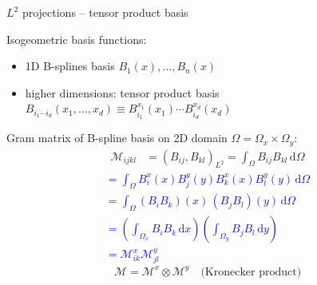 \documentclass[c]{beamer}
\newcommand{\inblue}[1]{\textcolor{blue}{#1}}
\newcommand{\Prod}[2]{(#1, #2)_{L^2}}
\begin{document}
\begin{frame}{$L^2$ projections -- tensor product basis}

Isogeometric basis functions:
\begin{itemize}
  \item 1D B-splines basis $B_1(x),\ldots, B_n(x)$
  \item higher dimensions: tensor product basis\\
        $B_{i_1\cdots i_d}(x_1,\ldots,x_d)
        \equiv B^{x_1}_{i_1}(x_1)\cdots B^{x_d}_{i_d}(x_d)$ \\
\end{itemize}
Gram matrix of B-spline basis on 2D domain $\Omega = \Omega_x \times \Omega_y$:
\begin{equation*}
  \begin{aligned}
  \mathcal{M}_{ijkl} &=
  \Prod{B_{ij}}{B_{kl}} =
  \int_\Omega B_{ij}B_{kl}\,\mbox{d}\Omega 
  \end{aligned}
\end{equation*}
 \inblue{\begin{equation*}
  \begin{aligned}
=\int_\Omega B^x_i(x) B^y_j(y) B^x_k(x) B^y_l(y) \,\mbox{d}\Omega \\
  = \int_\Omega (B_i B_k)(x)\,(B_j B_l)(y)\,\mbox{d}\Omega  \\
  = \left(\int_{\Omega_x} B_i B_k \,\mbox{d}x\right)
  \left(\int_{\Omega_y} B_j B_l \,\mbox{d}y\right) \\
  = \mathcal{M}^x_{ik} \mathcal{M}^y_{jl}
  \end{aligned}
\end{equation*}}
\begin{equation*}
\mathcal{M} = \mathcal{M}^x \otimes \mathcal{M}^y \quad\text{(Kronecker product)}
\end{equation*}

\end{frame}


\end{document}
